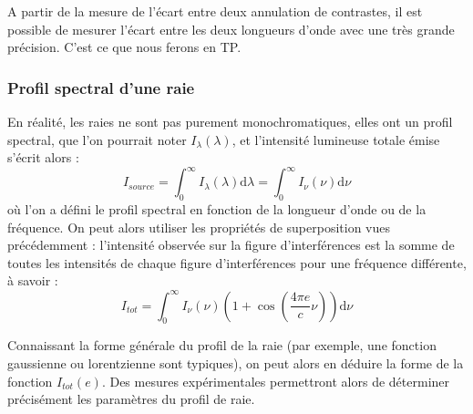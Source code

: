 \documentclass[11pt,fleqn]{book} %
\newcommand{\dd}{\mathrm{d}}
\begin{document}
A partir de la mesure de l'écart entre deux annulation de contrastes, il est possible de mesurer l'écart entre les deux longueurs d'onde avec une très grande précision. C'est ce que nous ferons en TP.

\subsubsection{Profil spectral d'une raie}

En réalité, les raies ne sont pas purement monochromatiques, elles ont un profil spectral, que l'on pourrait noter $I_\lambda(\lambda)$, et l'intensité lumineuse totale émise s'écrit alors :
\begin{equation}
	I_{source} = \int_0^\infty I_\lambda(\lambda) \dd \lambda = \int_0^\infty I_\nu(\nu) \dd \nu
\end{equation}
où l'on a défini le profil spectral en fonction de la longueur d'onde ou de la fréquence. On peut alors utiliser les propriétés de superposition vues précédemment : l'intensité observée sur la figure d'interférences est la somme de toutes les intensités de chaque figure d'interférences pour une fréquence différente, à savoir :
\begin{equation}
	I_{tot} = \int_0^\infty I_\nu(\nu) \left( 1 + \cos\left(\frac{4\pi e}{c} \nu \right) \right) \dd \nu
\end{equation}

Connaissant la forme générale du profil de la raie (par exemple, une fonction gaussienne ou lorentzienne sont typiques), on peut alors en déduire la forme de la fonction $I_{tot}(e)$. Des mesures expérimentales permettront alors de déterminer précisément les paramètres du profil de raie.
\end{document}
